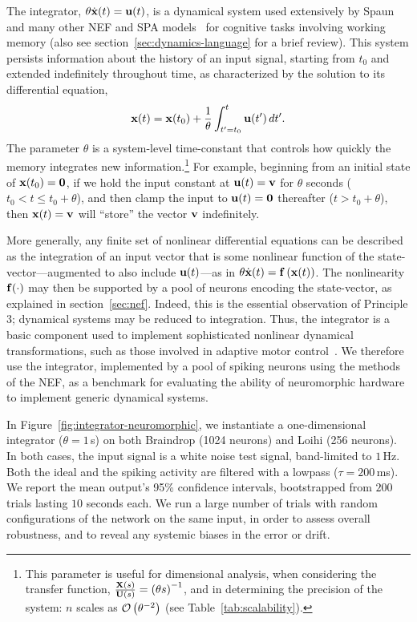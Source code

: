The integrator, $\theta \dot{\mathbf{x}}(t) = \mathbf{u}(t)$, is a dynamical system used extensively by Spaun~\citep{eliasmith2012} and many other NEF and SPA models~\citep[][to name a few]{singh2004, trujillo2014a, rasmussen2017} for cognitive tasks involving working memory (also see section~\ref{sec:dynamics-language} for a brief review).
This system persists information about the history of an input signal, starting from $t_0$ and extended indefinitely throughout time, as characterized by the solution to its differential equation,
$$\mathbf{x}(t) = \mathbf{x}(t_0) + \frac{1}{\theta} \int_{t'=t_0}^{t} \mathbf{u}(t')\, dt' \text{.}$$
The parameter $\theta$ is a system-level time-constant that controls how quickly the memory integrates new information.\footnote{%
This parameter is useful for dimensional analysis, when considering the transfer function, $\frac{\mathbf{X}(s)}{\mathbf{U}(s)} = \left( \theta s \right)^{-1}$, and in determining the precision of the system: $n$ scales as $\mathcal{O}\left({\theta^{-2}}\right)$ (see Table~\ref{tab:scalability}).}
For example, beginning from an initial state of $\mathbf{x}(t_0) = \mathbf{0}$, if we hold the input constant at $\mathbf{u}(t) = \mathbf{v}$ for $\theta$ seconds ($t_0 < t \le t_0 + \theta$), and then clamp the input to $\mathbf{u}(t) = \mathbf{0}$ thereafter ($t > t_0 + \theta$), then $\mathbf{x}(t) = \mathbf{v}$ will ``store'' the vector $\mathbf{v}$ indefinitely.

More generally, any finite set of nonlinear differential equations can be described as the integration of an input vector that is some nonlinear function of the state-vector---augmented to also include $\mathbf{u}(t)$---as in $\theta \dot{\mathbf{x}}(t) = \mathbf{f}\left({\mathbf{x}(t)}\right)$.
The nonlinearity $\mathbf{f}(\cdot)$ may then be supported by a pool of neurons encoding the state-vector, as explained in section~\ref{sec:nef}.
Indeed, this is the essential observation of Principle 3; dynamical systems may be reduced to integration.
Thus, the integrator is a basic component used to implement sophisticated nonlinear dynamical transformations, such as those involved in adaptive motor control~\citep{dewolf2016}.
We therefore use the integrator, implemented by a pool of spiking neurons using the methods of the NEF, as a benchmark for evaluating the ability of neuromorphic hardware to implement generic dynamical systems.

In Figure~\ref{fig:integrator-neuromorphic}, we instantiate a one-dimensional integrator ($\theta = 1$\,s) on both Braindrop (1024 neurons) and Loihi (256 neurons).
In both cases, the input signal is a white noise test signal, band-limited to $1$\,Hz.
Both the ideal and the spiking activity are filtered with a lowpass ($\tau = 200$\,ms).
We report the mean output's 95\% confidence intervals, bootstrapped from $200$ trials lasting $10$ seconds each.
We run a large number of trials with random configurations of the network on the same input, in order to assess overall robustness, and to reveal any systemic biases in the error or drift.

